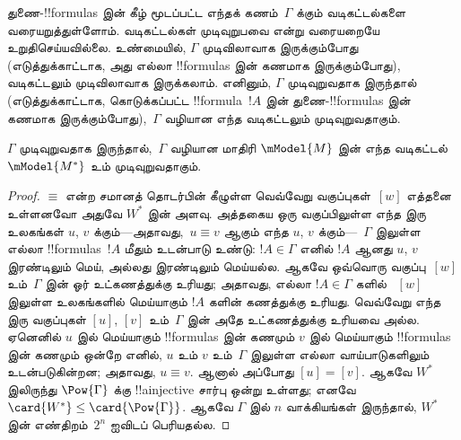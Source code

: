 \documentclass[../../../include/open-logic-section]{subfiles}
\begin{document}


துணை-!!{formula}s இன் கீழ் மூடப்பட்ட எந்தக் கணம்~$\Gamma$ க்கும்
வடிகட்டல்களை வரையறுத்துள்ளோம். வடிகட்டல்கள் முடிவுறுபவை என்று வரையறையே
உறுதிசெய்யவில்லை. உண்மையில், $\Gamma$ முடிவிலாவாக இருக்கும்போது
(எடுத்துக்காட்டாக, அது எல்லா !!{formula}s இன் கணமாக இருக்கும்போது),
வடிகட்டலும் முடிவிலாவாக இருக்கலாம். எனினும், $\Gamma$ முடிவுறுவதாக இருந்தால்
(எடுத்துக்காட்டாக, கொடுக்கப்பட்ட !!{formula}~$!A$ இன் துணை-!!{formula}s இன்
கணமாக இருக்கும்போது),~$\Gamma$ வழியான எந்த வடிகட்டலும் முடிவுறுவதாகும்.

\begin{prop}
  $\Gamma$ முடிவுறுவதாக இருந்தால்,~$\Gamma$ வழியான மாதிரி
  $\mModel{M}$ இன் எந்த வடிகட்டல் $\mModel{M^*}$ உம் முடிவுறுவதாகும்.
\end{prop}

\begin{proof}
  $\equiv$ என்ற சமானத் தொடர்பின் கீழுள்ள வெவ்வேறு வகுப்புகள்~$[w]$ எத்தனை
  உள்ளனவோ அதுவே $W^*$ இன் அளவு. அத்தகைய ஒரு வகுப்பிலுள்ள எந்த இரு
  உலகங்கள் $u$, $v$ க்கும்---அதாவது,~$u \equiv v$ ஆகும் எந்த $u$, $v$
  க்கும்---~$\Gamma$ இலுள்ள எல்லா !!{formula}s~$!A$ மீதும் உடன்பாடு
  உண்டு: $!A \in \Gamma$ எனில் $!A$ ஆனது $u$, $v$ இரண்டிலும் மெய்,
  அல்லது இரண்டிலும் மெய்யல்ல. ஆகவே ஒவ்வொரு வகுப்பு~$[w]$ உம்~$\Gamma$
  இன் ஓர் உட்கணத்துக்கு உரியது; அதாவது, எல்லா $!A \in \Gamma$ களில்
  ~$[w]$ இலுள்ள உலகங்களில் மெய்யாகும் $!A$ களின் கணத்துக்கு உரியது.
  வெவ்வேறு எந்த இரு
  வகுப்புகள் $[u]$, $[v]$ உம்~$\Gamma$ இன் அதே உட்கணத்துக்கு உரியவை அல்ல.
  ஏனெனில் $u$ இல் மெய்யாகும் !!{formula}s இன் கணமும் $v$ இல் மெய்யாகும்
  !!{formula}s இன் கணமும் ஒன்றே எனில், $u$ உம் $v$ உம்~$\Gamma$ இலுள்ள
  எல்லா வாய்பாடுகளிலும் உடன்படுகின்றன; அதாவது, $u \equiv v$. ஆனால் அப்போது
  $[u] = [v]$. ஆகவே $W^*$ இலிருந்து $\Pow{\Gamma}$ க்கு
  !!a{injective} சார்பு ஒன்று உள்ளது; எனவே
  $\card{W^*} \le \card{\Pow{\Gamma}}$. ஆகவே $\Gamma$ இல் $n$ வாக்கியங்கள்
  இருந்தால், $W^*$ இன் எண்திறம்~$2^n$ ஐவிடப் பெரியதல்ல.
\end{proof}
\end{document}
